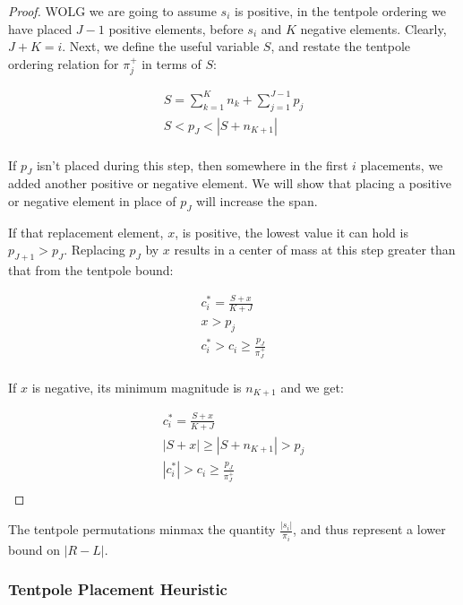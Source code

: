 \documentclass[11pt,twocolumn]{article}
\begin{document}
\begin{proof}
WOLG we are going to assume $s_i$ is positive, in the tentpole ordering we have placed $J-1$ positive elements, before $s_i$ and $K$ negative elements.  Clearly, $J+K=i$.  Next, we define the useful variable $S$, and restate the tentpole ordering relation for $\pi^+_j$ in terms of $S$:

\begin{align*}
S = \sum_{k=1}^{K} n_k + \sum_{j=1}^{J-1} p_j \\
S < p_J < |S + n_{K+1}| \\
\end{align*}

If $p_J$ isn't placed during this step, then somewhere in the first $i$ placements, we added another positive or negative element.  We will show that placing a positive or negative element in place of $p_J$ will increase the span.

If that replacement element, $x$, is positive, the lowest value it can hold is $p_{J+1} > p_J$.  Replacing $p_J$ by $x$ results in a center of mass at this step greater than that from the tentpole bound:

\begin{align*}
c_i^* = \frac{S + x}{K +J} \\
x > p_j \\
c_i^* > c_i \geq \frac{p_J}{\pi^+_J} \\
\end{align*}

If $x$ is negative, its minimum magnitude is $n_{K+1}$ and we get:

\begin{align*}
c_i^* = \frac{S + x}{K +J} \\
|S+x| \geq |S+n_{K+1}|  > p_j \\
|c_i^*| > c_i \geq \frac{p_J}{\pi^+_J} \\
\end{align*}


\end{proof}

\begin{thm} \label{thm:tentpoleBound}
The tentpole permutations minmax the quantity $\frac{|s_i|}{\pi_i}$, and thus represent a lower bound on $|R-L|$.
\end{thm}

\subsubsection{Tentpole Placement Heuristic} \label{sec:tentpoleHeuristic}
\end{document}
